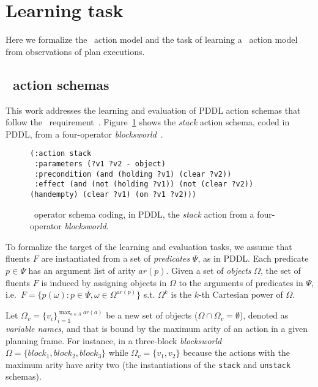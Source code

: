 \section{Learning task}
\label{sec:learning}
Here we formalize the \strips\ action model and the task of learning a \strips\ action model from observations of plan executions.


\subsection{\strips\ action schemas}
This work addresses the learning and evaluation of PDDL action schemas that follow the \strips\ requirement~\cite{mcdermott1998pddl,fox2003pddl2}. Figure~\ref{fig:stack} shows the {\em stack} action schema, coded in PDDL, from a four-operator {\em blocksworld}~\cite{slaney2001blocks}.

\begin{figure}[hbt!]
\begin{footnotesize}
\begin{verbatim}
(:action stack
 :parameters (?v1 ?v2 - object)
 :precondition (and (holding ?v1) (clear ?v2))
 :effect (and (not (holding ?v1)) (not (clear ?v2)) (handempty) (clear ?v1) (on ?v1 ?v2)))
\end{verbatim}
\end{footnotesize}
 \caption{\small \strips\ operator schema coding, in PDDL, the {\em stack} action from a four-operator {\em blocksworld}.}
\label{fig:stack}
\end{figure}

To formalize the target of the learning and evaluation tasks, we assume that fluents $F$ are instantiated from a set of {\em predicates} $\Psi$, as in PDDL. Each predicate $p\in\Psi$ has an argument list of arity $ar(p)$. Given a set of {\em objects} $\Omega$, the set of fluents $F$ is induced by assigning objects in $\Omega$ to the arguments of predicates in $\Psi$, i.e.~$F=\{p(\omega):p\in\Psi,\omega\in\Omega^{ar(p)}\}$ s.t. $\Omega^k$ is the $k$-th Cartesian power of $\Omega$.

Let $\Omega_v=\{v_i\}_{i=1}^{\operatorname*{max}_{a\in A} ar(a)}$ be a new set of objects ($\Omega\cap\Omega_v=\emptyset$), denoted as {\em variable names}, and that is bound by the maximum arity of an action in a given planning frame. For instance, in a three-block {\em blocksworld} $\Omega=\{block_1, block_2, block_3\}$ while $\Omega_v=\{v_1, v_2\}$ because the actions with the maximum arity have arity two (the instantiations of the {\small\tt stack} and {\small\tt unstack} schemas).

